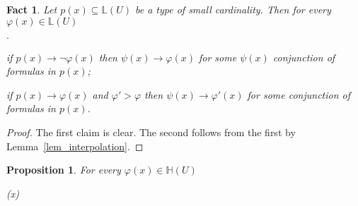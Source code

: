 \documentclass[11pt,oneside]{amsart}
\newcommand{\mylabel}[1]{{#1}\hfill}
\renewenvironment{itemize}
  {\begin{list}{$\cdot$}{%
   \setlength{\parskip}{0mm}
   \setlength{\topsep}{.2\baselineskip}
   \setlength{\rightmargin}{0mm}
   \setlength{\listparindent}{0mm}
   \setlength{\itemindent}{0mm}
   \setlength{\labelwidth}{3ex}
   \setlength{\itemsep}{.2\baselineskip}
   \setlength{\parsep}{.2\baselineskip}
   \setlength{\partopsep}{0mm}
   \setlength{\labelsep}{1ex}
   \setlength{\leftmargin}{\labelwidth+\labelsep}
   \let\makelabel\mylabel}}{%
   \end{list}}
\theoremstyle{plain}
\newtheorem{proposition}[theorem]{Proposition}
\newtheorem{fact}[theorem]{Fact}
\theoremstyle{remark}
\begin{document}
\begin{fact}\label{prop_compactness_imp}
  Let $p(x)\subseteq\mathds{L}(U)$ be a type of small cardinality.
  Then for every  $\varphi(x)\in\mathds{L}(U)$
  \begin{itemize}
    \item[1.] if $p(x)\rightarrow\neg\varphi(x)$ then $\psi(x)\rightarrow\varphi(x)$ for some $\psi(x)$ conjunction of formulas in $p(x)$;
    \item[2.] if $p(x)\rightarrow\varphi(x)$ and $\varphi'>\varphi$ then $\psi(x)\rightarrow\varphi'(x)$ for some conjunction of formulas in $p(x)$.
  \end{itemize} 
\end{fact}

\begin{proof}
  The first claim is clear.
  The second follows from the first by Lemma~\ref{lem_interpolation}.
\end{proof}



\begin{proposition}\label{prop_approx}
  For every $\varphi(x)\in\mathds{H}(U)$ 

  {\leftrightarrow}
  {\varphi(x)}

\end{proposition}
\end{document}
